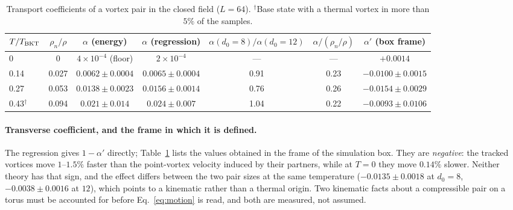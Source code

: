 \documentclass[11pt,a4paper]{article}
\begin{document}
\begin{table}[t]\centering\small
\begin{tabular}{lcccccc}
\toprule
$T/T_{\rm BKT}$ & $\rho_n/\rho$ & $\alpha$ (energy) & $\alpha$ (regression) & $\alpha(d_0{=}8)/\alpha(d_0{=}12)$ & $\alpha/(\rho_n/\rho)$ & $\alpha'$ (box frame)\\
\midrule
0 & 0 & $4\times10^{-4}$ (floor) & $2\times10^{-4}$ & --- & --- & $+0.0014$\\
0.14 & 0.027 & $0.0062\pm0.0004$ & $0.0065\pm0.0004$ & 0.91 & 0.23 & $-0.0100\pm0.0015$\\
0.27 & 0.053 & $0.0138\pm0.0023$ & $0.0156\pm0.0014$ & 0.76 & 0.26 & $-0.0154\pm0.0029$\\
0.43$^{\dagger}$ & 0.094 & $0.021\pm0.014$ & $0.024\pm0.007$ & 1.04 & 0.22 & $-0.0093\pm0.0106$\\
\bottomrule
\end{tabular}
\caption{Transport coefficients of a vortex pair in the closed field ($L=64$). $^{\dagger}$Base state with a thermal
vortex in more than $5\%$ of the samples.}
\label{tab:alpha}
\end{table}

\paragraph{Transverse coefficient, and the frame in which it is defined.} The regression gives $1-\alpha'$
directly; Table~\ref{tab:alpha} lists the values obtained in the frame of the simulation box. They are
\emph{negative}: the tracked vortices move $1$--$1.5\%$ faster than the point-vortex velocity induced by their
partners, while at $T=0$ they move $0.14\%$ slower. Neither theory has that sign, and the effect differs between the
two pair sizes at the same temperature ($-0.0135\pm0.0018$ at $d_0=8$, $-0.0038\pm0.0016$ at $12$), which points to a
kinematic rather than a thermal origin. Two kinematic facts about a compressible pair on a torus must be accounted
for before Eq.~\eqref{eq:motion} is read, and both are measured, not assumed.
\end{document}
